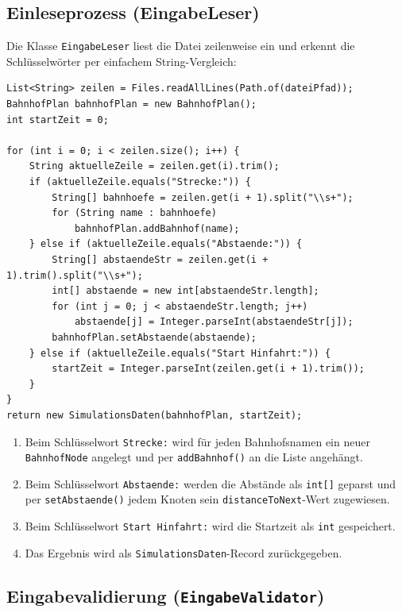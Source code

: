 \documentclass[12pt,a4paper]{article}
\begin{document}
\subsection{Einleseprozess (EingabeLeser)}

Die Klasse \texttt{EingabeLeser} liest die Datei zeilenweise ein und erkennt die Schlüsselwörter per einfachem String-Vergleich:

\begin{lstlisting}[caption={Kernteil von EingabeLeser.leseDatei()}]
List<String> zeilen = Files.readAllLines(Path.of(dateiPfad));
BahnhofPlan bahnhofPlan = new BahnhofPlan();
int startZeit = 0;

for (int i = 0; i < zeilen.size(); i++) {
    String aktuelleZeile = zeilen.get(i).trim();
    if (aktuelleZeile.equals("Strecke:")) {
        String[] bahnhoefe = zeilen.get(i + 1).split("\\s+");
        for (String name : bahnhoefe)
            bahnhofPlan.addBahnhof(name);
    } else if (aktuelleZeile.equals("Abstaende:")) {
        String[] abstaendeStr = zeilen.get(i + 1).trim().split("\\s+");
        int[] abstaende = new int[abstaendeStr.length];
        for (int j = 0; j < abstaendeStr.length; j++)
            abstaende[j] = Integer.parseInt(abstaendeStr[j]);
        bahnhofPlan.setAbstaende(abstaende);
    } else if (aktuelleZeile.equals("Start Hinfahrt:")) {
        startZeit = Integer.parseInt(zeilen.get(i + 1).trim());
    }
}
return new SimulationsDaten(bahnhofPlan, startZeit);
\end{lstlisting}

\begin{enumerate}
    \item Beim Schlüsselwort \texttt{Strecke:} wird für jeden Bahnhofsnamen ein neuer \texttt{BahnhofNode} angelegt und per \texttt{addBahnhof()} an die Liste angehängt.
    \item Beim Schlüsselwort \texttt{Abstaende:} werden die Abstände als \texttt{int[]} geparst und per \texttt{setAbstaende()} jedem Knoten sein \texttt{distanceToNext}-Wert zugewiesen.
    \item Beim Schlüsselwort \texttt{Start Hinfahrt:} wird die Startzeit als \texttt{int} gespeichert.
    \item Das Ergebnis wird als \texttt{SimulationsDaten}-Record zurückgegeben.
\end{enumerate}

\subsection{Eingabevalidierung (\texttt{EingabeValidator})}
\label{sec:eingabevalidierung}
\end{document}
